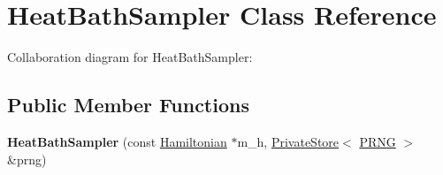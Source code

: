 \hypertarget{classHeatBathSampler}{}\section{Heat\+Bath\+Sampler Class Reference}
\label{classHeatBathSampler}


Collaboration diagram for Heat\+Bath\+Sampler\+:
\subsection*{Public Member Functions}
\begin{DoxyCompactItemize}
\item 
{\bfseries Heat\+Bath\+Sampler} (const \hyperlink{classHamiltonian}{Hamiltonian} $\ast$m\+\_\+h, \hyperlink{classPrivateStore}{Private\+Store}$<$ \hyperlink{classPRNG}{P\+R\+NG} $>$ \&prng)\hypertarget{classHeatBathSampler_a1451ee391a7bf45458d1200a23cb7ec4}{}\label{classHeatBathSampler_a1451ee391a7bf45458d1200a23cb7ec4}

\end{DoxyCompactItemize}
